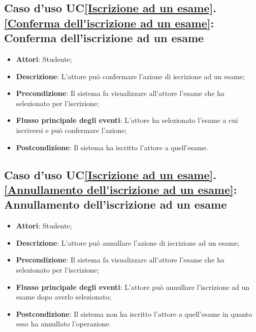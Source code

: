 \subsection{Caso d'uso UC\ref{Iscrizione ad un esame}.\ref{Conferma dell'iscrizione ad un esame}: Conferma dell'iscrizione ad un esame}
\begin{itemize}
	\item \textbf{Attori}: Studente;
	\item \textbf{Descrizione}: L'attore può confermare l'azione di iscrizione ad un esame;
	\item \textbf{Precondizione}: Il sistema fa visualizzare all'attore l'esame che ha selezionato per l'iscrizione;
	\item \textbf{Flusso principale degli eventi}: L'attore ha selezionato l'esame a cui iscriversi e può confermare l'azione;
	\item \textbf{Postcondizione}: Il sistema ha iscritto l'attore a quell'esame.
\end{itemize}

\subsection{Caso d'uso UC\ref{Iscrizione ad un esame}.\ref{Annullamento dell'iscrizione ad un esame}: Annullamento dell'iscrizione ad un esame}
\begin{itemize}
	\item \textbf{Attori}: Studente;
	\item \textbf{Descrizione}: L'attore può annullare l'azione di iscrizione ad un esame;
	\item \textbf{Precondizione}: Il sistema fa visualizzare all'attore l'esame che ha selezionato per l'iscrizione;
	
	\item \textbf{Flusso principale degli eventi}: L'attore può annullare l'iscrizione ad un esame dopo averlo selezionato;
	\item \textbf{Postcondizione}: Il sistema non ha iscritto l'attore a quell'esame in quanto esso ha annullato l'operazione.
	
\end{itemize}

